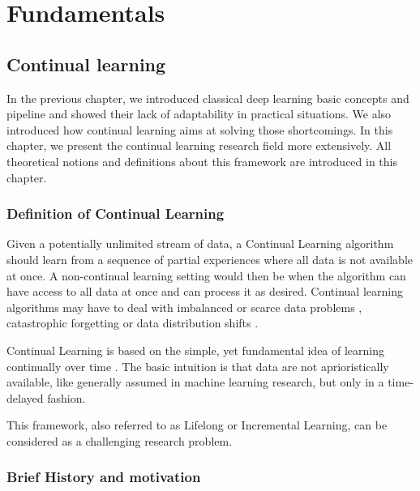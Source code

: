 \documentclass[english, LaM, oneside]{sapthesis}%
\begin{document}
\part{Fundamentals}


\chapter{Continual learning}
\label{chap:2}
In the previous chapter, we introduced classical deep learning basic concepts and pipeline and showed their lack of adaptability in practical situations. We also introduced how continual learning aims at solving those shortcomings. In this chapter, we present the continual learning research field more extensively. All theoretical notions and definitions about this framework are introduced in this chapter. 
\section{Definition of Continual Learning}
Given a potentially unlimited stream of data, a Continual Learning algorithm should learn from a sequence of partial experiences where all data is not available at once. A non-continual learning setting would then be when the algorithm can have access to all data at once and can process it as desired. Continual learning algorithms may have to deal with imbalanced or scarce data problems \cite{drossos}, catastrophic forgetting \cite{sprechamn} or data distribution shifts \cite{gepperth}.

Continual Learning is based on the simple, yet fundamental idea of learning continually over time \cite{chen-2018, ring}. The basic intuition is that data are not aprioristically available, like generally assumed in machine learning research, but only in a time- delayed fashion.

This framework, also referred to as Lifelong or Incremental Learning, can be considered as a challenging research problem. 

\section{Brief History and motivation}
\end{document}
